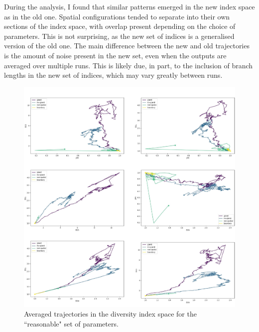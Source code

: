 During the analysis, I found that similar patterns emerged in the new index
space as in the old one. Spatial configurations tended to separate into their
own sections of the index space, with overlap present depending on the choice
of parameters. This is not surprising, as the new set of indices is a
generalised version of the old one. The main difference between the new and old
trajectories is the amount of noise present in the new set, even when the
outputs are averaged over multiple runs. This is likely due, in part, to the
inclusion of branch lengths in the new set of indices, which may vary greatly
between runs.

\begin{figure}[h!]
    \centering
    \includegraphics[width=\textwidth]{Chapter_3/figures/1e0501new.pdf}
    \caption{Averaged trajectories in the diversity index space for the
    ``reasonable" set of parameters.}
    \label{fig:1e05_01new}
\end{figure}
